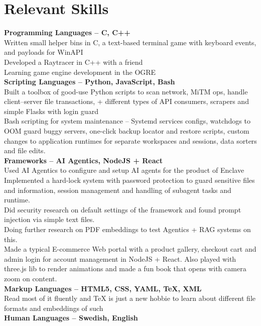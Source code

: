 \documentclass[12pt]{article}
\begin{document}
\section*{Relevant Skills}
\textbf{Programming Languages -- C, C++}\\
Written small helper bins in C, a text-based terminal game with keyboard events, and payloads for WinAPI\\[0.4cm]
Developed a Raytracer in C++ with a friend\\ 
Learning game engine development in the OGRE\\[0.4cm]
\textbf{Scripting Languages -- Python, JavaScript, Bash}\\
Built a toolbox of good-use Python scripts to scan network, MiTM ops, handle client--server file transactions,
+ different types of API consumers, scrapers and simple Flasks with login guard\\[0.4cm]
Bash scripting for system maintenance -- Systemd services configs, watchdogs to OOM guard buggy servers, one-click backup locator and restore scripts,
custom changes to application runtimes for separate workspaces and sessions, data sorters and file edits.\\[0.4cm]
\textbf{Frameworks -- AI Agentics, NodeJS + React}\\
Used AI Agentics to configure and setup AI agents for the product of Enclave\\
Implemented a hard-lock system with password protection to guard sensitive files and information, session management and handling of subagent tasks and runtime.\\
Did security research on default settings of the framework and found prompt injection via simple text files.\\
Doing further research on PDF embeddings to test Agentics + RAG systems on this.\\[0.4cm]
Made a typical E-commerce Web portal with a product gallery, checkout cart and admin login for account management in NodeJS + React.
Also played with three.js lib to render animations and made a fun book that opens with camera zoom on content.\\[0.4cm]
\textbf{Markup Languages -- HTML5, CSS, YAML, TeX, XML}\\
Read most of it fluently and TeX is just a new hobbie to learn about different file formats and embeddings of such\\[0.4cm]
\textbf{Human Languages -- Swedish, English}\\[0.4cm]
\end{document}
